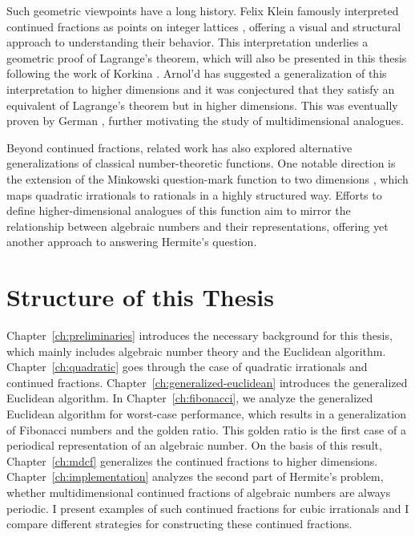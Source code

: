 Such geometric viewpoints have a long history. Felix Klein famously interpreted
continued fractions as points on integer lattices \cite{Klein95}, offering
a visual and structural approach to understanding their behavior.
This interpretation underlies a geometric proof of Lagrange’s theorem, which will
also be presented in this thesis following the work of Korkina \cite{Korkina96}.
Arnol'd has suggested a generalization of this interpretation to higher dimensions \cite{Arnold98}
and it was conjectured that they satisfy an equivalent of Lagrange's theorem but in higher dimensions.
This was eventually proven by German \cite{German08}, further motivating the study of
multidimensional analogues.

Beyond continued fractions, related work has also explored alternative
generalizations of classical number-theoretic functions.
One notable direction is the extension of the Minkowski question-mark function
to two dimensions \cite{Beaver04}, which maps quadratic irrationals to rationals in a highly structured way.
Efforts to define higher-dimensional analogues of this function aim to mirror
the relationship between algebraic numbers and their representations,
offering yet another approach to answering Hermite’s question.

\section{Structure of this Thesis}

Chapter~\ref{ch:preliminaries} introduces the necessary background for this thesis,
which mainly includes algebraic number theory and the Euclidean algorithm.
Chapter~\ref{ch:quadratic} goes through the case of quadratic irrationals
and continued fractions.
Chapter~\ref{ch:generalized-euclidean} introduces the generalized Euclidean algorithm.
In Chapter~\ref{ch:fibonacci}, we analyze the generalized Euclidean algorithm for worst-case performance,
which results in a generalization of Fibonacci numbers and the golden ratio.
This golden ratio is the first case of a periodical representation of an algebraic number.
On the basis of this result, Chapter~\ref{ch:mdcf} generalizes the continued fractions to higher dimensions.
Chapter~\ref{ch:implementation} analyzes the second part of Hermite's problem,
whether multidimensional continued fractions of algebraic numbers are always periodic.
I present examples of such continued fractions for cubic irrationals and I
compare different strategies for constructing these continued fractions.
